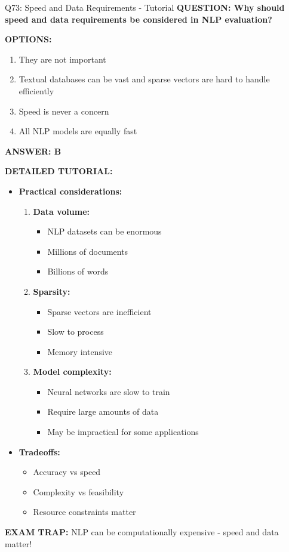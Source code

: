 \documentclass[8pt]{beamer}
\begin{document}
	\begin{frame}{Q73: Speed and Data Requirements - Tutorial}
		\fontsize{6.5}{7.5}\selectfont
		\textbf{QUESTION: Why should speed and data requirements be considered in NLP evaluation?}
		
		\vspace{0.1cm}
		\textbf{OPTIONS:}
		\begin{enumerate}
			\item They are not important
			\item Textual databases can be vast and sparse vectors are hard to handle efficiently
			\item Speed is never a concern
			\item All NLP models are equally fast
		\end{enumerate}
		
		\vspace{0.1cm}
		\textcolor{myblue}{\textbf{ANSWER: B}}
		
		\vspace{0.1cm}
		\textbf{DETAILED TUTORIAL:}
		\begin{itemize}
			\item \textbf{Practical considerations:}
			\begin{enumerate}
				\item \textbf{Data volume:}
				\begin{itemize}
					\item NLP datasets can be enormous
					\item Millions of documents
					\item Billions of words
				\end{itemize}
				\item \textbf{Sparsity:}
				\begin{itemize}
					\item Sparse vectors are inefficient
					\item Slow to process
					\item Memory intensive
				\end{itemize}
				\item \textbf{Model complexity:}
				\begin{itemize}
					\item Neural networks are slow to train
					\item Require large amounts of data
					\item May be impractical for some applications
				\end{itemize}
			\end{enumerate}
			\item \textbf{Tradeoffs:}
			\begin{itemize}
				\item Accuracy vs speed
				\item Complexity vs feasibility
				\item Resource constraints matter
			\end{itemize}
		\end{itemize}
		
		\textcolor{myred}{\textbf{EXAM TRAP:}} NLP can be \textcolor{myblue}{computationally expensive} - speed and data matter!
	\end{frame}
	
\end{document}
